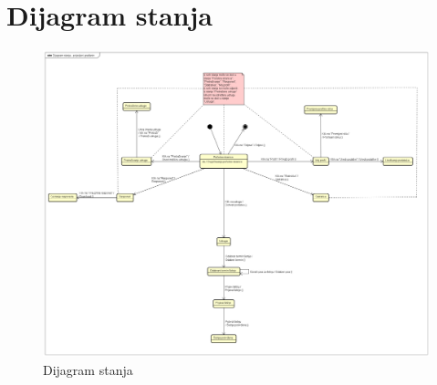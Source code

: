 			\section{Dijagram stanja}
			\begin{figure}[H]
				\includegraphics[width=\linewidth]{slike/D_stanja.png}
				\centering
				\caption{Dijagram stanja}
				\label{fig:dijagramstanja}
			\end{figure}
			
			\eject

